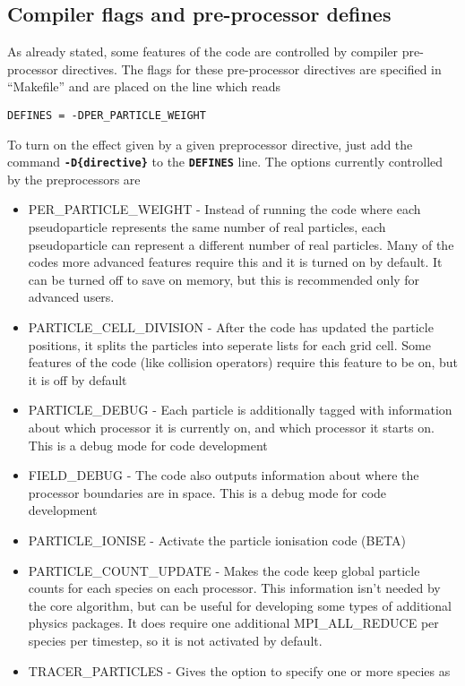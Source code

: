 \documentclass[12pt,a4paper]{article}
\newcommand{\simpleboxverbatim}{\begin{Verbatim}[obeytabs=true,frame=single,
  framerule=0.5mm,rulecolor=\color{warwickmid},formatcom=\color{black}]}
\newcommand{\inlinecode}[1]{{\color{warwickred} \bf\texttt{#1}}}
\begin{document}
\subsection{Compiler flags and pre-processor defines}
As already stated, some features of the code are controlled by compiler
pre-processor directives. The flags for these pre-processor directives are
specified in ``Makefile'' and are placed on the line which reads\\
\simpleboxverbatim
DEFINES = -DPER_PARTICLE_WEIGHT
\end{Verbatim}
To turn on the effect given by a given preprocessor directive, just add the
command \inlinecode{-D\{directive\}} to the \inlinecode{DEFINES} line. The
options currently controlled by the preprocessors are\\
\begin{itemize}
\item PER\_PARTICLE\_WEIGHT - Instead of running the code where each
  pseudoparticle represents the same number of real particles, each
  pseudoparticle can represent a different number of real particles. Many of
  the codes more advanced features require this and it is turned on by
  default. It can be turned off to save on memory, but this is recommended
  only for advanced users.
\item PARTICLE\_CELL\_DIVISION - After the code has updated the particle
  positions, it splits the particles into seperate lists for each grid
  cell. Some features of the code (like collision operators) require this
  feature to be on, but it is off by default
\item PARTICLE\_DEBUG - Each particle is additionally tagged with information
  about which processor it is currently on, and which processor it starts
  on. This is a debug mode for code development
\item FIELD\_DEBUG - The code also outputs information about where the
  processor boundaries are in space. This is a debug mode for code development
\item PARTICLE\_IONISE - Activate the particle ionisation code (BETA)
\item PARTICLE\_COUNT\_UPDATE - Makes the code keep global particle counts for
  each species on each processor. This information isn't needed by the core
  algorithm, but can be useful for developing some types of additional physics
  packages. It does require one additional MPI\_ALL\_REDUCE per species per
  timestep, so it is not activated by default.
\item TRACER\_PARTICLES - Gives the option to specify one or more species as

\end{itemize}
\end{document}
